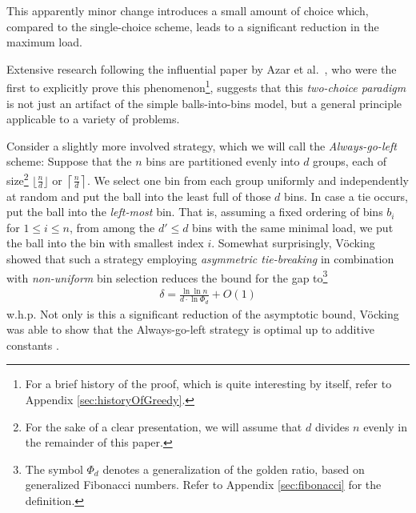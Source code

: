\documentclass[a4paper,12pt]{article}
\begin{document}
This apparently minor change introduces a small amount of choice which, compared to the single-choice scheme, leads to a significant reduction in the maximum load. 
\begin{comment}
Curiously, the exponential decrease in the gap is already achieved having just two choices (that is, $d=2$). Each additional choice decreases the bound for the maximum gap by just a constant factor~\cite{MRS01}. 
\end{comment}
Extensive research following the influential paper by Azar et al.~\cite{ABKU99}, who were the first to explicitly prove this phenomenon\footnote{For a brief history of the proof, which is quite interesting by itself, refer to Appendix \ref{sec:historyOfGreedy}.}, suggests that this \emph{two-choice paradigm} is not just an artifact of the simple balls-into-bins model, but a general principle applicable to a variety of problems. 

Consider a slightly more involved strategy, which we will call the \emph{Always-go-left} scheme: Suppose that the $n$ bins are partitioned evenly into $d$ groups, each of size\footnote{For the sake of a clear presentation, we will assume that $d$ divides $n$ evenly in the remainder of this paper.} $\lfloor \frac{n}{d}\rfloor$ or $\left\lceil\frac{n}{d}\right\rceil$. We select one bin from each group uniformly and independently at random and put the ball into the least full of those $d$ bins. In case a tie occurs, put the ball into the \emph{left-most} bin. That is, assuming a fixed ordering of bins $b_i$ for $1 \leq i \leq n$, from among the $d' \leq d$ bins with the same minimal load, we put the ball into the bin with smallest index $i$. Somewhat surprisingly, V\"ocking \cite{VOC03} showed that such a strategy employing \emph{asymmetric tie-breaking} in combination with \emph{non-uniform} bin selection reduces the bound for the gap to\footnote{The symbol $\Phi_d$ denotes a generalization of the golden ratio, based on generalized Fibonacci numbers. Refer to Appendix \ref{sec:fibonacci} for the definition.}
\begin{align}
\delta = \frac{\ln\ln n}{d \cdot \ln \Phi_d} + O(1)
\end{align}
w.h.p. Not only is this a significant reduction of the asymptotic bound, V\"ocking was able to show that the Always-go-left strategy is optimal up to additive constants \cite{VOC03}.
\end{document}
